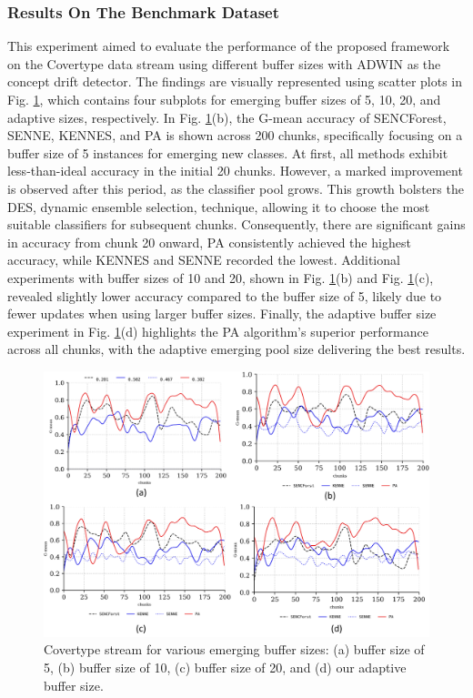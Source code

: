 \subsubsection{Results On The Benchmark Dataset}
\label{sec:covertype}
This experiment aimed to evaluate the performance of the proposed framework on the Covertype data stream using different buffer sizes with ADWIN as the concept drift detector. The findings are visually represented using scatter plots in Fig. \ref{fig:res1}, which contains four subplots for emerging buffer sizes of 5, 10, 20, and adaptive sizes, respectively. In Fig. \ref{fig:res1}(b), the G-mean accuracy of SENCForest, SENNE, KENNES, and PA is shown across 200 chunks, specifically focusing on a buffer size of 5 instances for emerging new classes. At first, all methods exhibit less-than-ideal accuracy in the initial 20 chunks. However, a marked improvement is observed after this period, as the classifier pool grows. This growth bolsters the DES, dynamic ensemble selection, technique, allowing it to choose the most suitable classifiers for subsequent chunks. Consequently, there are significant gains in accuracy from chunk 20 onward, PA consistently achieved the highest accuracy, while KENNES and SENNE recorded the lowest. Additional experiments with buffer sizes of 10 and 20, shown in Fig. \ref{fig:res1}(b) and Fig. \ref{fig:res1}(c), revealed slightly lower accuracy compared to the buffer size of 5, likely due to fewer updates when using larger buffer sizes. Finally, the adaptive buffer size experiment in Fig. \ref{fig:res1}(d) highlights the PA algorithm's superior performance across all chunks, with the adaptive emerging pool size delivering the best results.

\begin{figure}[!ht]
	\centering
	\includegraphics[width=1\linewidth]{5_Emerging/images/res1.png}
	\caption{Covertype stream for various emerging buffer sizes: (a) buffer size of 5, (b) buffer size of 10, (c) buffer size of 20, and (d) our adaptive buffer size.}
	\label{fig:res1}
\end{figure}				

